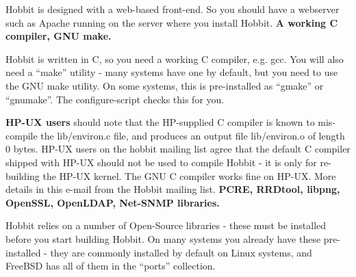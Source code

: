  Hobbit is designed with a web-based front-end. So you should have a webserver such as Apache running on the server where you install Hobbit.
\textbf{A working C compiler, GNU make.}


 Hobbit is written in C, so you need a working C compiler, e.g. gcc. You will also need a ``make'' utility - many systems have one by default, but you need to use the GNU make utility. On some systems, this is pre-installed as ``gmake'' or ``gnumake''. The configure-script checks this for you.


 \textbf{HP-UX users}
 should note that the HP-supplied C compiler is known to mis-compile the lib/environ.c file, and produces an output file lib/environ.o of length 0 bytes. HP-UX users on the hobbit mailing list agree that the default C compiler shipped with HP-UX should not be used to compile Hobbit - it is only for re-building the HP-UX kernel. The GNU C compiler works fine on HP-UX. More details in this e-mail from the Hobbit mailing list.
\textbf{PCRE, RRDtool, libpng, OpenSSL, OpenLDAP, Net-SNMP libraries.}


 Hobbit relies on a number of Open-Source libraries - these must be installed before you start building Hobbit. On many systems you already have these pre-installed - they are commonly installed by default on Linux systems, and FreeBSD has all of them in the ``ports'' collection.


